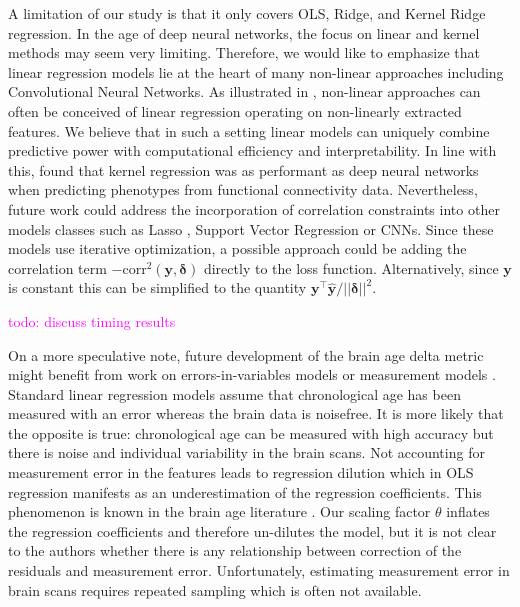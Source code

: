 \documentclass[utf8]{frontiersSCNS} %
\newcommand{\todo}[1]{\textcolor{Magenta}{todo: #1}}
\renewcommand{\a}{\theta}
\newcommand{\corr}{\text{corr}}
\renewcommand{\d}{\boldsymbol{\delta}}
\newcommand{\y}{\mathbf{y}}
\newcommand{\yh}{\mathbf{\hat{y}}}
\begin{document}
A limitation of our study is that it only covers OLS, Ridge, and Kernel Ridge regression. In the age of deep neural networks, the focus on linear and kernel methods may seem very limiting.  Therefore, we would like to emphasize that linear regression models lie at the heart of many non-linear approaches including Convolutional Neural Networks. As illustrated in , non-linear approaches can often be conceived of linear regression operating on non-linearly extracted features. We believe that in such a setting linear models can uniquely combine predictive power with computational efficiency and interpretability. In line with this, \cite{He2020DeepDemographics} found that kernel regression was as performant as deep neural networks when predicting phenotypes from functional connectivity data. Nevertheless, future work could address the incorporation of correlation constraints into other models classes such as Lasso \citep{Tibshirani2011RegressionRetrospective}, Support Vector Regression \citep{Muller1997} or CNNs. Since these models use iterative optimization, a possible approach could be adding the correlation term $-\corr^2(\y,\d)$ directly to the loss function. Alternatively, since $\y$ is constant this can be simplified to the quantity $\y^\top\yh / ||\d||^2$.

\todo{discuss timing results}

On a more speculative note, future development of the brain age delta metric might benefit from work on errors-in-variables models \citep{Frost2000CorrectingJSTOR,Berglund2012RegressionCalculation,Gleser1981EstimationResults} or measurement models \citep{Fuller1987MeasurementModels}. Standard linear regression models assume that chronological age has been measured with an error whereas the brain data is noisefree. It is more likely that the opposite is true: chronological age can be measured with high accuracy but there is noise and individual variability in the brain scans. Not accounting for measurement error in the features leads to regression dilution which in OLS regression manifests as an underestimation of the regression coefficients. This phenomenon is known in the brain age literature \citep{Smith2019EstimationImaging,Le2018ABrainAGE}. Our scaling factor $\a$ inflates the regression coefficients and therefore un-dilutes the model, but it is not clear to the authors whether there is any relationship between correction of the residuals and measurement error. Unfortunately, estimating measurement error in brain scans requires repeated sampling which is often not available. 
\end{document}
